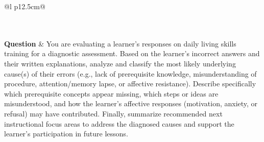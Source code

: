 \begin{longtable}{@{}l p{12.5cm}@{}}
  \caption{Skills per-instance answer comparison ($\Delta \leq -75\%$) for the 1 most divergent items: same question, each model's answer and reasoning.}\label{tab:cmp_skills_neg75} \\
  \toprule
  \endfirsthead
  \toprule
  \endhead
   \\
  \textbf{Question} & You are evaluating a learner's responses on daily living skills training for a diagnostic assessment. Based on the learner's incorrect answers and their written explanations, analyze and classify the most likely underlying cause(s) of their errors (e.g., lack of prerequisite knowledge, misunderstanding of procedure, attention/memory lapse, or affective resistance). Describe specifically which prerequisite concepts appear missing, which steps or ideas are misunderstood, and how the learner's affective responses (motivation, anxiety, or refusal) may have contributed. Finally, summarize recommended next instructional focus areas to address the diagnosed causes and support the learner's participation in future lessons. \\

\end{longtable}
